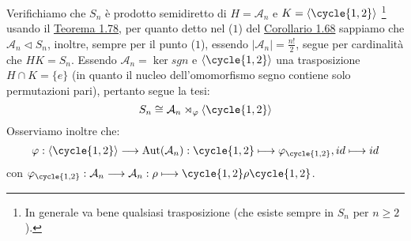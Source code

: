 \documentclass[11pt]{scrartcl}
\begin{document}
\begin{example}
    Verifichiamo che $S_n$ è prodotto semidiretto di $H = \mathcal{A}_n$ e $ K = \left<\cycle{1,2}\right>$ \footnote{In generale va bene qualsiasi trasposizione (che esiste sempre in $S_n$ per $n \geq 2$).}
    usando il \hyperref[t:1.78]{Teorema 1.78}, per quanto detto nel ($1$) del \hyperref[c:1.68]{Corollario 1.68} sappiamo che $\mathcal{A}_n \triangleleft S_n$, inoltre, sempre per il punto ($1$), essendo $|\mathcal{A}_n| = \frac{n!}{2}$, segue
    per cardinalità che $HK = S_n$. Essendo $\mathcal{A}_n = \ker sgn$ e $\left<\cycle{1,2}\right>$ una trasposizione $H \cap K = \{e\}$ (in quanto il nucleo dell'omomorfismo segno contiene solo permutazioni pari), pertanto segue la tesi:
        \[ S_n \cong \mathcal{A}_n \rtimes_{\varphi} \left<\cycle{1,2}\right>
            \]
    Osserviamo inoltre che:
        \[ \varphi : \left<\cycle{1,2}\right> \longrightarrow \Aut(\mathcal{A}_n) : \cycle{1,2} \longmapsto \varphi_{\cycle{1,2}}, id \longmapsto id
            \]
    con $\varphi_{\cycle{1,2}} : \mathcal{A}_n \longrightarrow \mathcal{A}_n : \rho \longmapsto \cycle{1,2}\rho\cycle{1,2}$.
\end{example}
\end{document}
